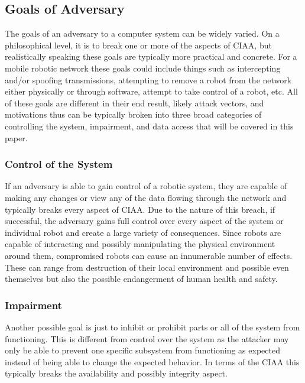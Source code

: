 \subsection{Goals of Adversary}

The goals of an adversary to a computer system can be widely varied. On a philosophical level, it is to break one or more of the aspects of CIAA, but realistically speaking these goals are typically more practical and concrete. For a mobile robotic network these goals could include things such as intercepting and/or spoofing transmissions, attempting to remove a robot from the network either physically or through software, attempt to take control of a robot, etc. All of these goals are different in their end result, likely attack vectors, and motivations thus can be typically broken into three broad categories of controlling the system, impairment, and data access that will be covered in this paper.
\\  %
\subsubsection{Control of the System}

If an adversary is able to gain control of a robotic system, they are capable of making any changes or view any of the data flowing through the network and typically breaks every aspect of CIAA. Due to the nature of this breach, if successful, the adversary gains full control over every aspect of the system or individual robot and create a large variety of consequences. Since robots are capable of interacting and possibly manipulating the physical environment around them, compromised robots can cause an innumerable number of effects. These can range from destruction of their local environment and possible even themselves but also the possible endangerment of human health and safety. 


\subsubsection{Impairment}

Another possible goal is just to inhibit or prohibit parts or all of the system from functioning. This is different from control over the system as the attacker may only be able to prevent one specific subsystem from functioning as expected instead of being able to change the expected behavior. In terms of the CIAA this typically breaks the availability and possibly integrity aspect.  

